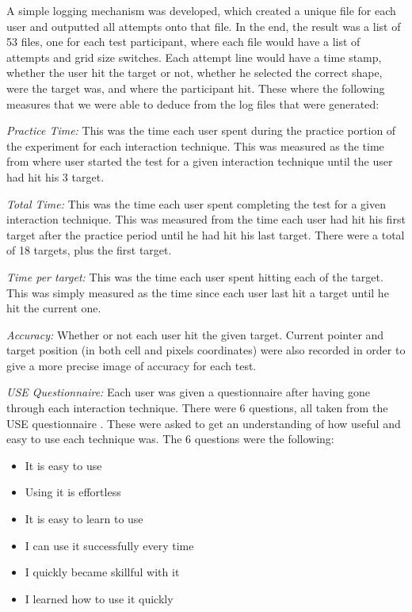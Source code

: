 A simple logging mechanism was developed, which created a unique file for each user and outputted all attempts onto that file. In the end, the result was a list of 53 files, one for each test participant, where each file would have a list of attempts and grid size switches. Each attempt line would have a time stamp, whether the user hit the target or not, whether he selected the correct shape, were the target was, and where the participant hit. These where the following measures that we were able to deduce from the log files that were generated: 

\textit{Practice Time:} This was the time each user spent during the practice portion of the experiment for each interaction technique. 
This was measured as the time from where user started the test for a given interaction technique until the user had hit his 3 target. 

\textit{Total Time:} This was the time each user spent completing the test for a given interaction technique. 
This was measured from the time each user had hit his first target after the practice period until he had hit his last target. 
There were a total of 18 targets, plus the first target. 

\textit{Time per target:} This was the time each user spent hitting each of the target. 
This was simply measured as the time since each user last hit a target until he hit the current one.

\textit{Accuracy:} Whether or not each user hit the given target. 
Current pointer and target position (in both cell and pixels coordinates) were also recorded in order to give a more precise image of accuracy for each test. 

\textit{USE Questionnaire:} Each user was given a questionnaire after having gone through each interaction technique. 
There were 6 questions, all taken from the USE questionnaire \cite{lund2001measuring}. 
These were asked to get an understanding of how useful and easy to use each technique was. 
The 6 questions were the following: 

\begin{itemize}
	\item It is easy to use
	\item Using it is effortless
	\item It is easy to learn to use
	\item I can use it successfully every time
	\item I quickly became skillful with it
	\item I learned how to use it quickly
\end{itemize}

